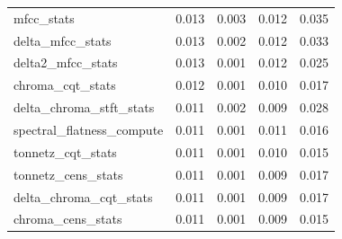 \documentclass[11pt]{article}
\begin{document}
\begin{table}
\begin{tabular}{lrrrr}
mfcc\_stats & 0.013 & 0.003 & 0.012 & 0.035 \\
delta\_mfcc\_stats & 0.013 & 0.002 & 0.012 & 0.033 \\
delta2\_mfcc\_stats & 0.013 & 0.001 & 0.012 & 0.025 \\
chroma\_cqt\_stats & 0.012 & 0.001 & 0.010 & 0.017 \\
delta\_chroma\_stft\_stats & 0.011 & 0.002 & 0.009 & 0.028 \\
spectral\_flatness\_compute & 0.011 & 0.001 & 0.011 & 0.016 \\
tonnetz\_cqt\_stats & 0.011 & 0.001 & 0.010 & 0.015 \\
tonnetz\_cens\_stats & 0.011 & 0.001 & 0.009 & 0.017 \\
delta\_chroma\_cqt\_stats & 0.011 & 0.001 & 0.009 & 0.017 \\
chroma\_cens\_stats & 0.011 & 0.001 & 0.009 & 0.015 \\
\bottomrule
  \end{tabular}
\end{table}
\end{document}
